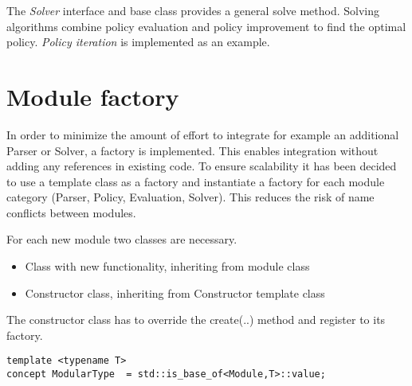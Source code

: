 The \emph{Solver} interface and base class provides a general solve method. Solving algorithms combine policy evaluation and policy improvement to find the optimal policy. \emph{Policy iteration} is implemented as an example.

\section{Module factory}
\label{integration}

In order to minimize the amount of effort to integrate for example an additional Parser or Solver, a factory is implemented. This enables integration without adding any references in existing code. To ensure scalability it has been decided to use a template class as a factory and instantiate a factory for each module category (Parser, Policy, Evaluation, Solver). This reduces the risk of name conflicts between modules.

For each new module two classes are necessary.


%

\begin{itemize}
	\item Class with new functionality, inheriting from module class
	\item Constructor class, inheriting from Constructor template class
\end{itemize}

The constructor class has to override the create(..) method and register to its factory.


\begin{lstlisting}
template <typename T>
concept ModularType  = std::is_base_of<Module,T>::value;
\end{lstlisting}

